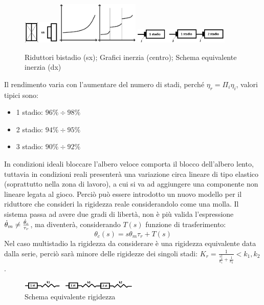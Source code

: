 \begin{figure}[h]
    \centering
    \includegraphics[width=0.15\textwidth]{Immagini/ridutt_2st_diff_dim.png}
    \includegraphics[width=0.35\textwidth]{Immagini/momento_inerzia_stadi.png}
    \includegraphics[width=0.4\textwidth]{Immagini/momento_inerzia_albero_veloce.png}
    \caption{Riduttori bistadio (sx); Grafici inerzia (centro); Schema equivalente inerzia (dx)}
\end{figure}

Il rendimento varia con l'aumentare del numero di stadi, perché $\eta_r=\Pi_i \eta_i$, valori tipici sono:
\begin{itemize}
    \item 1 stadio: $96\% \div 98\%$
    \item 2 stadio: $94\% \div 95\%$
    \item 3 stadio: $90\% \div 92\%$
\end{itemize}

In condizioni ideali bloccare l'albero veloce comporta il blocco dell'albero lento, tuttavia in condizioni reali presenterà una variazione circa lineare di tipo elastico (soprattutto nella zona di lavoro), a cui si va ad aggiungere una componente non lineare legata al gioco.
Perciò può essere introdotto un nuovo modello per il riduttore che consideri la rigidezza reale considerandolo come una molla.
Il sistema passa ad avere due gradi di libertà, non è più valida l'espressione $\dot{\theta}_m \neq \frac{\dot{\theta}_c}{\tau_r}$, ma diventerà, considerando $T(s)$ funzione di trasferimento:
\[\theta_c(s)=s \theta_m \tau_r + T(s)\]
Nel caso multistadio la rigidezza da considerare è una rigidezza equivalente data dalla serie, perciò sarà minore delle rigidezze dei singoli stadi: $K_r=\frac{1}{\frac{\tau_2^2}{k_1}+\frac{1}{k_2}}<k_1,k_2$.

\begin{figure}[h]
    \centering
    \includegraphics[width=0.5\textwidth]{Immagini/rigidezza_1_2_stadi.png}
    \caption{Schema equivalente rigidezza}
\end{figure}

